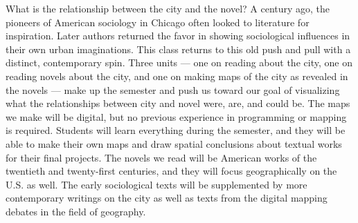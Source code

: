 What is the relationship between the city and the novel? A century ago, the
pioneers of American sociology in Chicago often looked to literature for
inspiration. Later authors returned the favor in showing sociological
influences in their own urban imaginations. This class returns to this old push
and pull with a distinct, contemporary spin. Three units — one on reading about
the city, one on reading novels about the city, and one on making maps of the
city as revealed in the novels — make up the semester and push us toward our
goal of visualizing what the relationships between city and novel were, are,
and could be. The maps we make will be digital, but no previous experience in
programming or mapping is required. Students will learn everything during the
semester, and they will be able to make their own maps and draw spatial
conclusions about textual works for their final projects. The novels we read
will be American works of the twentieth and twenty-first centuries, and they
will focus geographically on the U.S. as well. The early sociological texts
will be supplemented by more contemporary writings on the city as well as texts
from the digital mapping debates in the field of geography. 
